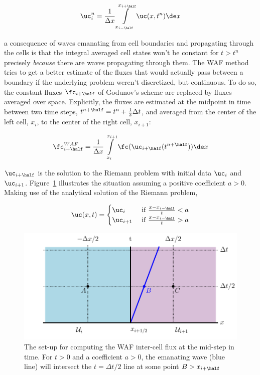 \begin{align}
    \uc_i^n = \frac{1}{\Delta x} \int\limits_{x_{i-\half}}^{x_{i+\half}} \uc(x, t^n) \de x
\end{align}

a consequence of waves emanating from cell boundaries and propagating through the cells is that the
integral averaged cell states won't be constant for $t > t^n$ precisely \emph{because} there are
waves propagating through them.
The WAF method tries to get a better estimate of the fluxes that would actually pass between
a boundary if the underlying problem weren't discretized, but continuous. To do so, the constant
fluxes $\fc_{i + \half}$ of Godunov's scheme are replaced by fluxes averaged over space.
Explicitly, the fluxes are estimated at the midpoint in time between two time steps, $t^{n+\half} =
t^n + \frac{1}{2} \Delta t$, and averaged from the center of the left cell, $x_i$, to the center of
the right cell, $x_{i+1}$:

\begin{align}
    \fc_{i+\half}^{WAF} = \frac{1}{\Delta x} \int\limits_{x_i}^{x_{i+1}} \fc(\uc_{i+\half}(
t^{n+\half})) \de x
\end{align}

$\uc_{i+\half}$ is the solution to the Riemann problem with initial data $\uc_i$ and $\uc_{i+1}$.
Figure~\ref{fig:advection-WAF} illustrates the situation assuming a positive coefficient $a > 0$.
Making use of the analytical solution of the Riemann problem,

\begin{align}
    \uc(x, t) = \begin{cases}
                 \uc_i & \text{ if } \frac{x - x_{i-\half}}{t} < a \\
                 \uc_{i+1} & \text{ if } \frac{x - x_{i-\half}}{t} > a
                \end{cases}
\end{align}





\begin{figure}
    \centering
    \includegraphics[width=.8\textwidth]{./figures/FV/WAF.pdf}%
    \caption[WAF flux estimate for linear advection]{
The set-up for computing the WAF inter-cell flux at the mid-step in time. For $t > 0$ and a
coefficient $a > 0$, the emanating wave (blue line) will intersect the $t = \Delta t/2$ line at
some point $B > x_{i+\half}$
    }
    \label{fig:advection-WAF}
\end{figure}





